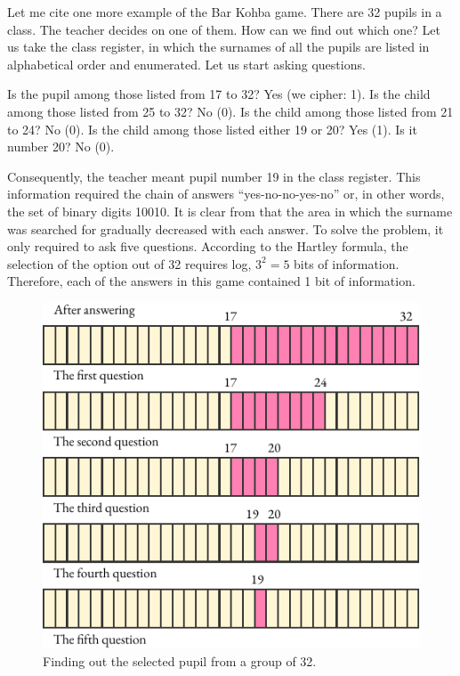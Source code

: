 Let me cite one more example of the Bar Kohba game. There are 32
pupils in a class. The teacher decides on one of them. How can we find
out which one? Let us take the class register, in which the surnames of
all the pupils are listed in alphabetical order and enumerated. Let us
start asking questions.
\begin{dialogue}
\ques Is the pupil among those listed from 17 to 32? 
\ans Yes (we cipher: 1).
\ques Is the child among those listed from 25 to 32?
\ans No (0). 
\ques Is the child among those listed from 21 to 24?
\ans No (0). 
\ques Is the child among those listed either 19 or 20?
\ans Yes (1).
\ques Is it number 20?
\ans No (0).
\end{dialogue}
Consequently, the teacher meant pupil number 19 in the class register.
This information required the chain of answers ``yes-no-no-yes-no'' or, in
other words, the set of binary digits 10010. It is clear from  that the area in which the surname was searched for gradually decreased
with each answer. To solve the problem, it only required to ask five
questions. According to the Hartley formula, the selection of the option
out of 32 requires log, $3^{2} = 5$ bits of information. Therefore, each of the
answers in this game contained 1 bit of information.
\begin{figure}[!ht]
 \centering
 \includegraphics[width=0.85\tfwidth]{figures/32-pupils.pdf}
\caption{Finding out the selected pupil from a group of 32.\label{32-pupils}}
 \end{figure}

